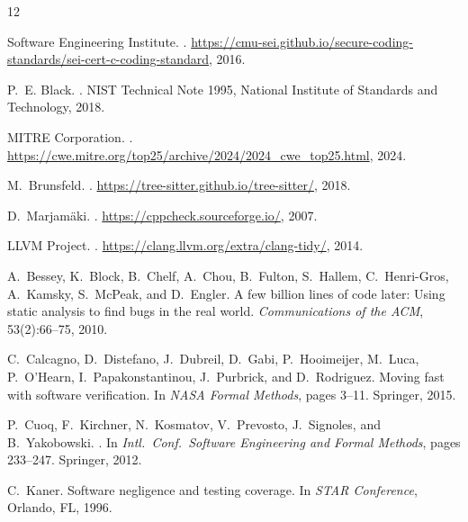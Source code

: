 


\begin{thebibliography}{12}

Software Engineering Institute.
.
\newblock \url{https://cmu-sei.github.io/secure-coding-standards/sei-cert-c-coding-standard}, 2016.

P.~E. Black.
.
\newblock NIST Technical Note 1995, National Institute of Standards and
  Technology, 2018.

{MITRE Corporation}.
.
\newblock \url{https://cwe.mitre.org/top25/archive/2024/2024_cwe_top25.html}, 2024.

M.~Brunsfeld.
.
\newblock \url{https://tree-sitter.github.io/tree-sitter/}, 2018.

D.~Marjam{\"a}ki.
.
\newblock \url{https://cppcheck.sourceforge.io/}, 2007.

{LLVM Project}.
.
\newblock \url{https://clang.llvm.org/extra/clang-tidy/}, 2014.

A.~Bessey, K.~Block, B.~Chelf, A.~Chou, B.~Fulton, S.~Hallem, C.~Henri-Gros,
  A.~Kamsky, S.~McPeak, and D.~Engler.
\newblock A few billion lines of code later: Using static analysis to find bugs
  in the real world.
\newblock \emph{Communications of the ACM}, 53(2):66--75, 2010.

C.~Calcagno, D.~Distefano, J.~Dubreil, D.~Gabi, P.~Hooimeijer, M.~Luca,
  P.~O'Hearn, I.~Papakonstantinou, J.~Purbrick, and D.~Rodriguez.
\newblock Moving fast with software verification.
\newblock In \emph{NASA Formal Methods}, pages 3--11. Springer, 2015.

P.~Cuoq, F.~Kirchner, N.~Kosmatov, V.~Prevosto, J.~Signoles, and
  B.~Yakobowski.
.
\newblock In \emph{Intl.\ Conf.\ Software Engineering and Formal
  Methods}, pages 233--247. Springer, 2012.

C.~Kaner.
\newblock Software negligence and testing coverage.
\newblock In \emph{STAR Conference}, Orlando, FL, 1996.


\end{thebibliography}
